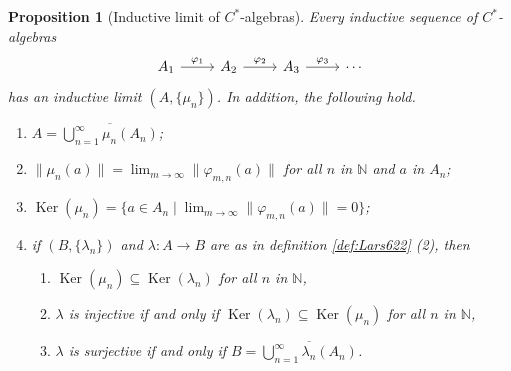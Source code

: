 \documentclass{book}
\newtheorem{proposition}[definition]{Proposition}
\def\cstars{\(C^*\)-algebras}
\begin{document}
\begin{proposition}[Inductive limit of \cstars]\label{prop:Lars624}
  Every inductive sequence of \cstars
  \[
    \begin{tikzcd}
      A_1\arrow[r,"\varphi_1"]&A_2\arrow[r,"\varphi_2"]&A_3\arrow[r,"\varphi_3"]&\cdots
    \end{tikzcd}
  \]
  has an inductive limit \((A,\{\mu_n\})\). In addition, the following hold.
  \begin{enumerate}
    \item \(A=\overline{\bigcup_{n=1}^\infty\mu_n(A_n)}\);
    \item \(\|\mu_n(a)\|=\lim_{m\to\infty}\|\varphi_{m,n}(a)\|\) for all \(n\) in \(\mathbb{N}\) and \(a\) in \(A_n\);
    \item \(\operatorname{Ker}(\mu_n)=\{a\in A_n\mid\lim_{m\to\infty}\|\varphi_{m,n}(a)\|=0\}\);
    \item if \((B,\{\lambda_n\})\) and \(\lambda:A\to B\) are as in definition \ref{def:Lars622} (2), then
      \begin{enumerate}
        \item \(\operatorname{Ker}(\mu_n)\subseteq\operatorname{Ker}(\lambda_n)\) for all \(n\) in \(\mathbb{N}\),
        \item \(\lambda\) is injective if and only if \(\operatorname{Ker}(\lambda_n)\subseteq\operatorname{Ker}(\mu_n)\) for all \(n\) in \(\mathbb{N}\),
        \item \(\lambda\) is surjective if and only if \(B=\overline{\bigcup_{n=1}^\infty \lambda_n(A_n)}\).
      \end{enumerate}
  \end{enumerate}
\end{proposition}
\end{document}
